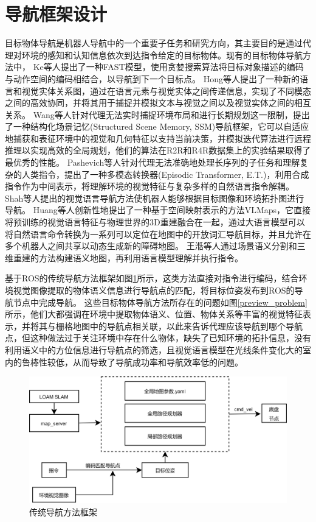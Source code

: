 \section{导航框架设计}
目标物体导航是机器人导航中的一个重要子任务和研究方向，其主要目的是通过代理对环境的感知和认知信息依次到达指令给定的目标物体。现有的目标物体导航方法中，
Ke\cite{ke2019tactical}等人提出了一种FAST模型，使用贪婪搜索算法将目标对象描述的编码与动作空间的编码相结合，以导航到下一个目标点。
Hong\cite{hong2020language}等人提出了一种新的语言和视觉实体关系图，通过在语言元素与视觉实体之间传递信息，实现了不同模态之间的高效协同，并将其用于捕捉并模拟文本与视觉之间以及视觉实体之间的相互关系。
Wang\cite{wang2021structured}等人针对代理无法实时捕捉环境布局和进行长期规划这一限制，提出了一种结构化场景记忆(Structured Scene Memory, SSM)导航框架，它可以自适应地捕获和表征环境中的视觉和几何特征以支持当前决策，并模拟迭代算法进行远程推理以实现高效的全局规划，他们的算法在R2R和R4R数据集上的实验结果取得了最优秀的性能。
Pashevich\cite{}等人针对代理无法准确地处理长序列的子任务和理解复杂的人类指令，提出了一种多模态转换器(Episodic Transformer, E.T.)，利用合成指令作为中间表示，将理解环境的视觉特征与复杂多样的自然语言指令解耦。
Shah\cite{shah2021ving}等人提出的视觉语言导航方法使机器人能够根据目标图像和环境拓扑图进行导航。
Huang\cite{huang2023visual}等人创新性地提出了一种基于空间映射表示的方法VLMaps，它直接将预训练的视觉语言特征与物理世界的3D重建融合在一起，通过大语言模型可以将自然语言命令转换为一系列可以定位在地图中的开放词汇导航目标，并且允许在多个机器人之间共享以动态生成新的障碍地图。
王湉\cite{王湉2024基于大语言模型的人机交互移动检测机器人导航方法}等人通过场景语义分割和三维重建的方法构建语义地图，再利用语言模型理解并执行指令。

基于ROS的传统导航方法框架如图\ref{buchong1}所示，这类方法直接对指令进行编码，结合环境视觉图像提取的物体语义信息进行导航点的匹配，将目标位姿发布到ROS的导航节点中完成导航。
这些目标物体导航方法所存在的问题如图\ref{preview_problem}所示，他们大都强调在环境中提取物体语义、位置、物体关系等丰富的视觉特征表示，并将其与栅格地图中的导航点相关联，以此来告诉代理应该导航到哪个导航点，但这种做法过于关注环境中存在什么物体，缺失了已知环境的拓扑信息，没有利用语义中的方位信息进行导航点的筛选，且视觉语言模型在光线条件变化大的室内的鲁棒性较低，从而导致了导航成功率和导航效率低的问题。
\begin{figure}[htbp]
    \centering
    \includegraphics[scale=0.12]{Fig/补充1传统方法框架.png}
    \caption{\label{buchong1}传统导航方法框架}
\end{figure}

